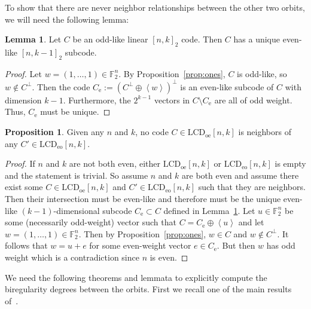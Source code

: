 \documentclass[11pt]{article}
\theoremstyle{definition}
\newtheorem{lemma}[theorem]{Lemma}
\newtheorem{proposition}[theorem]{Proposition}
\newcommand{\F}{\mathbb{F}}
\newcommand{\Ang}[1]{\left\langle#1\right\rangle}
\newcommand{\LCDoe}[2]{\mathrm{LCD}_{\mathrm{oe}} [#1, #2]}
\newcommand{\LCDeo}[2]{\mathrm{LCD}_{\mathrm{eo}} [#1, #2]}
\newcommand{\CodeCe}{C_{\mathrm{e}}}
\begin{document}
To show that there are never neighbor relationships between the other two orbits, we will need the following lemma:

\begin{lemma}\label{lem:even-subcode}
	Let $C$ be an odd-like linear ${[n, k]}_2$ code.
	Then $C$ has a unique even-like ${[n, k - 1]}_2$ subcode.
\end{lemma}

\begin{proof}
	Let $w = (1, \ldots, 1) \in \F_2^n$.
	By Proposition~\ref{prop:ones}, $C$ is odd-like, so $w \notin C^{\perp}$.
	Then the code $\CodeCe := {(C^{\perp} \oplus \Ang{w})}^\perp$ is an even-like subcode of $C$ with dimension $k - 1$.
	Furthermore, the $2^{k - 1}$ vectors in $C \setminus \CodeCe$ are all of odd weight.
	Thus, $\CodeCe$ must be unique.
\end{proof}

\begin{proposition}
	Given any $n$ and $k$, no code $C \in \LCDoe{n}{k}$ is neighbors of any $C' \in \LCDeo{n}{k}$.
\end{proposition}

\begin{proof}
	If $n$ and $k$ are not both even, either $\LCDoe{n}{k}$ or $\LCDeo{n}{k}$ is empty and the statement is trivial.
	So assume $n$ and $k$ are both even and assume there exist some $C \in \LCDoe{n}{k}$ and $C' \in \LCDeo{n}{k}$ such that they are neighbors.
	Then their intersection must be even-like and therefore must be the unique even-like $(k - 1)$-dimensional subcode $\CodeCe \subset C$ defined in Lemma~\ref{lem:even-subcode}.
	Let $u \in \F_2^n$ be some (necessarily odd-weight) vector such that $C = \CodeCe \oplus \Ang{u}$ and let $w = (1, \ldots, 1) \in \F_2^n$.
	Then by Proposition~\ref{prop:ones}, $w \in C$ and $w \notin C^{\perp}$.
	It follows that $w = u + e$ for some even-weight vector $e \in \CodeCe$.
	But then $w$ has odd weight which is a contradiction since $n$ is even.
\end{proof}

We need the following theorems and lemmata to explicitly compute the biregularity degrees between the orbits. First we recall one of the main results of~\cite{CMTQ18}.
\end{document}
